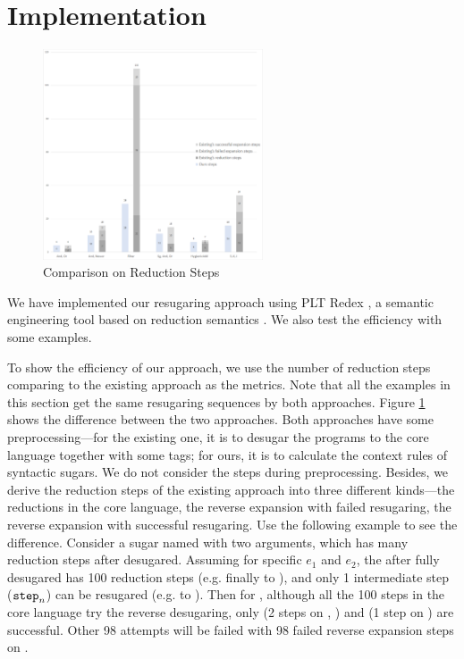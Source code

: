 \section{Implementation}
\label{sec:implementation}




\begin{figure}[thb]
	\centering
	\includegraphics[width=0.58\textwidth]{images/efficiency.png}
	\caption{Comparison on Reduction Steps}
	\label{fig:step}
\end{figure}
We have implemented our resugaring approach using PLT Redex \cite{SEwPR}, a semantic engineering tool based on reduction semantics \cite{reduction}. We also test the efficiency with some examples. 

To show the efficiency of our approach, we use the number of reduction steps comparing to the existing approach as the metrics. Note that all the examples in this section get the same resugaring sequences by both approaches. Figure \ref{fig:step} shows the difference between the two approaches. Both approaches have some preprocessing---for the existing one, it is to desugar the programs to the core language together with some tags; for ours, it is to calculate the context rules of syntactic sugars. We do not consider the steps during preprocessing. Besides, we derive the reduction steps of the existing approach into three different kinds---the reductions in the core language, the reverse expansion with failed resugaring, the reverse expansion with successful resugaring.  Use the following example to see the difference. Consider a sugar named  with two arguments, which has many reduction steps after desugared. Assuming for specific $e_1$ and $e_2$, the  after fully desugared has 100 reduction steps (e.g. finally to \m{\false}), and only 1 intermediate step ($\mbox{\tt step}_n$) can be resugared (e.g. to ). Then for , although all the 100 steps in the core language try the reverse desugaring, only  (2 steps on , ) and  (1 step on ) are successful. Other 98 attempts will be failed with 98 failed reverse expansion steps on .

